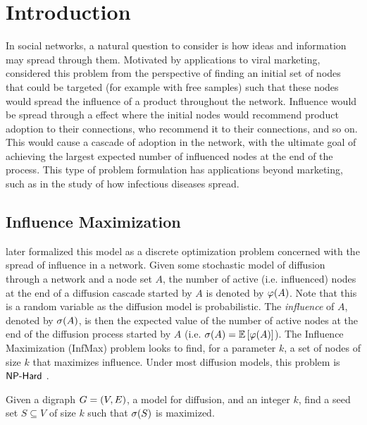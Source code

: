 \section{Introduction}
\label{sec:intro}
In social networks, a natural question to consider is how ideas and information may spread through them. Motivated by applications to viral marketing, \citet{domingos2001mining} considered this problem 
from the perspective of finding an initial set of nodes that could be targeted (for example with free samples) such that these nodes would spread the influence of a product throughout the network. Influence would be spread through a  effect where the initial nodes would recommend product adoption to their connections, who recommend it to their connections, and so on. 
This would cause a cascade of adoption in the network, with the ultimate goal of achieving the largest expected number of influenced nodes at the end of the process. 
This type of problem formulation has applications beyond marketing, such as in the study of how infectious diseases spread.  

\subsection{Influence Maximization}
\citet{kempe2003maximizing, kempe2005influential} later formalized this model as a discrete optimization problem concerned with the spread of influence in a network.
Given some stochastic model of diffusion through a network and a node set $A$, the number of active (i.e.\! influenced) nodes at the end of a diffusion cascade started by $A$ is denoted by $\varphi \! \left( A \right)$. 
Note that this is a random variable as the diffusion model is probabilistic. The \emph{influence} of $A$, denoted by $\sigma \! \left( A \right)$, is then the expected value of the number of active nodes at the end of the diffusion process started by $A$ (i.e.\! $\sigma \! \left( A \right) = \operatorname*{\mathbb{E}} \left[ \varphi \! \left( A \right) \right]$).
The \textsf{Influence Maximization (InfMax)} problem looks to find, for a parameter $k$, a  set of nodes of size $k$ that maximizes influence. 
Under most diffusion models, this problem is $\textsf{NP-Hard}$ \cite{kempe2003maximizing, kempe2005influential}. 

\begin{problem}
    Given a digraph $G = \left( V, E \right)$, a model for diffusion, and an integer $k$, find a seed set $S \subseteq V$ of size $k$
    such that $\sigma \! \left( S \right)$ is maximized. 
    \label{prob:infmax}
\end{problem}

